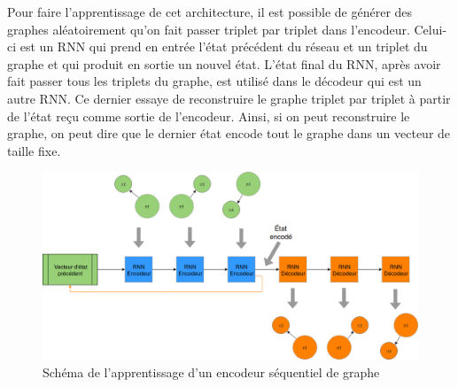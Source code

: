 Pour faire l’apprentissage de cet architecture, il est possible de générer des graphes aléatoirement qu’on fait passer triplet par triplet dans l’encodeur. Celui-ci est un RNN qui prend en entrée l’état précédent du réseau et un triplet du graphe et qui produit en sortie un nouvel état. L’état final du RNN, après avoir fait passer tous les triplets du graphe, est utilisé dans le décodeur qui est un autre RNN. Ce dernier essaye de reconstruire le graphe triplet par triplet à partir de l’état reçu comme sortie de l’encodeur. Ainsi, si on peut reconstruire le graphe, on peut dire que le dernier état encode tout le graphe dans un vecteur de taille fixe.
\begin{figure}[H] 
	\centering
	\includegraphics[width=0.8\linewidth]{images/Conception/DM/encoder_seq_train.png}
	\caption{Schéma de l'apprentissage d'un encodeur séquentiel de graphe}
	
\end{figure}\label{encoder_seq_train}
